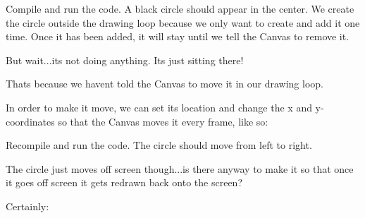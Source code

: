 Compile and run the code. A black circle should appear in the center. We create the circle outside the drawing loop because we only want to create and add it one time. Once it has been added, it will stay until we tell the Canvas to remove it.

But wait...it\textquotesingle{}s not doing anything. It\textquotesingle{}s just sitting there!

That\textquotesingle{}s because we haven\textquotesingle{}t told the Canvas to move it in our drawing loop.

In order to make it move, we can set its location and change the x and y-\/coordinates so that the Canvas moves it every frame, like so\+:


\begin{DoxyCode}{0}
\DoxyCodeLine{\textcolor{preprocessor}{\#include <tsgl.h>}}
\DoxyCodeLine{}
\DoxyCodeLine{  \textcolor{comment}{//Store the x and y-\/coordinate values in variables outside of the loop}}
\DoxyCodeLine{  \textcolor{comment}{//Let's draw a circle!}}
\DoxyCodeLine{  \textcolor{comment}{//Drawing loop}}
\DoxyCodeLine{    \textcolor{comment}{//Pass the x and y coordinates}}
\DoxyCodeLine{    \textcolor{comment}{//And change the x-\/coordinate once the circle has been drawn}}
\DoxyCodeLine{  \}}
\DoxyCodeLine{\}}
\end{DoxyCode}


Recompile and run the code. The circle should move from left to right.

The circle just moves off screen though...is there anyway to make it so that once it goes off screen it gets redrawn back onto the screen?

Certainly\+:


